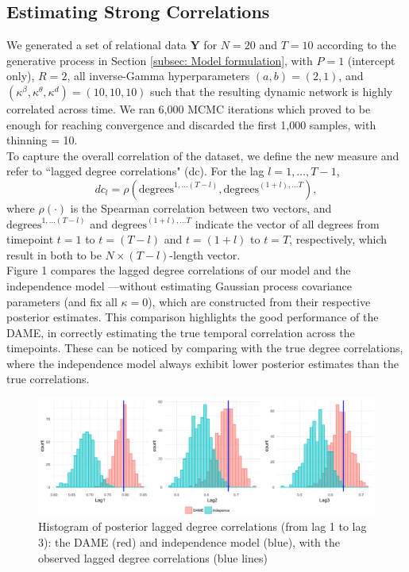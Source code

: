 \documentclass[a4paper]{article}
\begin{document}
\subsection{Estimating Strong Correlations} \label{subsec: correlation}
We generated a set of relational data $\mathbf{Y}$ for $N=20$ and $T=10$ according to the generative process in Section \ref{subsec: Model formulation}, with $P=1$ (intercept only), $R=2$, all inverse-Gamma hyperparameters $(a, b) = (2, 1)$, and $(\kappa^\beta, \kappa^\theta, \kappa^d) = (10, 10, 10)$ such that the resulting dynamic network is highly correlated across time. We ran 6,000 MCMC iterations which proved to be enough for reaching convergence and discarded the first 1,000 samples, with thinning = 10.\\\newline
To capture the overall correlation of the dataset, we define the new measure and refer to ``lagged degree correlations" (dc). For the lag $l=1,\ldots, T-1$,
\begin{equation}
dc_l = \rho(\mbox{degrees}^{1,\ldots (T-l)}, \mbox{degrees}^{(1+l),\ldots T}),
	\end{equation}
where $\rho(\cdot)$ is the Spearman correlation between two vectors, and $\mbox{degrees}^{1,\ldots (T-l)}$ and $\mbox{degrees}^{(1+l),\ldots T}$ indicate the vector of all degrees from timepoint $t=1$ to $t=(T-l)$ and $t=(1+l)$ to $t=T$, respectively, which result in both to be $N \times (T-l)$-length vector. \\ \newline
 Figure 1 compares the lagged degree correlations of our model and the independence model ---without estimating Gaussian process covariance parameters (and fix all $\kappa = 0$), which are constructed from their respective posterior estimates. This comparison highlights the good performance of the DAME, in correctly estimating the true temporal correlation across the timepoints. These can be noticed by comparing with the true degree correlations, where the independence model always exhibit lower posterior estimates than the true correlations.
\begin{figure}[H]
	\centering
		\includegraphics[width=1\textwidth]{plots_paper/correlations-1.png}	
	\caption {Histogram of posterior lagged degree correlations (from lag 1 to lag 3): the DAME (red) and independence model (blue), with the observed lagged degree correlations (blue lines)}
	\label{figure:correlationstudy}
\end{figure}
\end{document}

